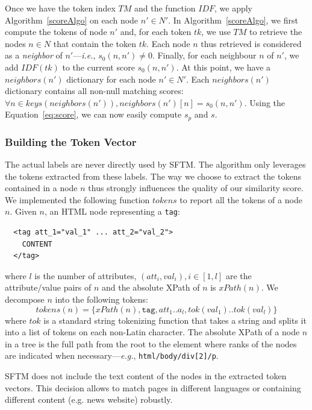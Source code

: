 Once we have the token index $TM$ and the function $IDF$, we apply Algorithm~\ref{scoreAlgo} on each node $n' \in N'$.
In Algorithm~\ref{scoreAlgo}, we first compute the tokens of node $n'$ and, for each token $tk$, we use $TM$ to retrieve the nodes $n \in N$ that contain the token $tk$.
Each node $n$ thus retrieved is considered as a \textit{neighbor} of $n'$---\emph{i.e.}, $s_0(n,n') \neq 0$.
Finally, for each neighbour $n$ of $n'$, we add $IDF(tk)$ to the current score $s_0(n,n')$.
At this point, we have a $neighbors(n')$ dictionary for each node $n' \in N'$.
Each $neighbors(n')$ dictionary contains all non-null matching scores: $\forall n \in keys(neighbors(n')), neighbors(n')[n] = s_0(n,n')$.
Using the Equation~\ref{eq:score}, we can now easily compute $s_{p}$ and $s$.

\subsubsection{Building the Token Vector}\label{tokenSelection}
The actual labels are never directly used by SFTM. The algorithm only leverages the tokens extracted from these labels. The way we choose to extract the tokens contained in a node $n$ thus strongly influences the quality of our similarity score.
We implemented the following function $tokens$ to report all the tokens of a node $n$.
Given $n$, an HTML node representing a \texttt{tag}:
\begin{verbatim}
  <tag att_1="val_1" ... att_2="val_2">
    CONTENT
  </tag> 
\end{verbatim}
where $l$ is the number of attributes, $(att_i, val_i), i \in [1,l]$ are the attribute/value pairs of $n$ and the absolute XPath of $n$ is $xPath(n)$.
We decompose $n$ into the following tokens:
\begin{equation}
	tokens(n) = \{xPath(n), \texttt{tag}, att_1..a_l, tok(val_1)..tok(val_l)\}
\end{equation}
where $tok$ is a standard string tokenizing function that takes a string and splits it into a list of tokens on each non-Latin character.
The absolute XPath of a node $n$ in a tree is the full path from the root to the element where ranks of the nodes are indicated when necessary---\emph{e.g.}, \texttt{html/body/div[2]/p}.

SFTM does not include the text content of the nodes in the extracted token vectors.
This decision allows to match pages in different languages or containing different content (e.g. news website) robustly.

